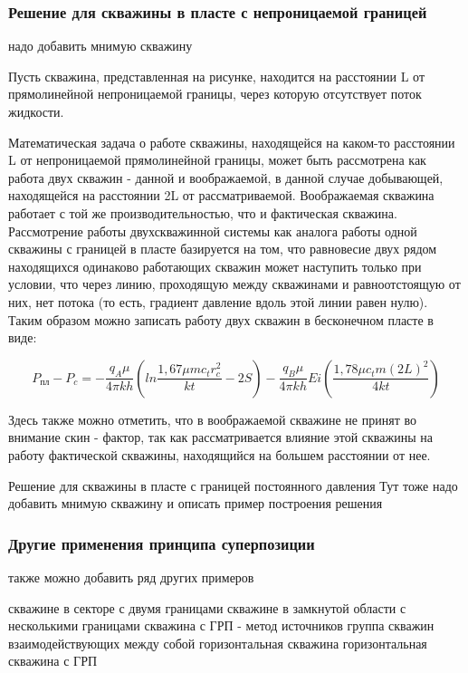 \subsubsection{Решение для скважины в пласте с непроницаемой границей}
надо добавить мнимую скважину

Пусть скважина, представленная на рисунке, находится на расстоянии L от прямолинейной непроницаемой границы, через которую отсутствует поток жидкости.



Математическая задача о работе скважины, находящейся на каком-то расстоянии L от непроницаемой прямолинейной границы, может быть рассмотрена как  работа двух скважин - данной и воображаемой, в данной случае добывающей, находящейся на расстоянии 2L от рассматриваемой. Воображаемая скважина работает с той же производительностью, что и фактическая скважина. Рассмотрение работы двухскважинной системы как аналога работы одной скважины с границей в пласте базируется на том, что равновесие двух рядом находящихся одинаково работающих скважин может наступить только при условии, что через линию, проходящую между скважинами и равноотстоящую от них, нет потока (то есть, градиент давление вдоль этой линии равен нулю). Таким образом можно записать работу двух скважин в бесконечном пласте в виде:

$$ P_{пл} - P_c = - \frac{q_A \mu}{4\pi kh} \left( ln \frac{1,67 \mu m c_t r_c^2}{kt}-2S \right)- \frac{q_B \mu}{4\pi kh} Ei \left( \frac{1,78 \mu c_t m \left(2L\right)^2}{4kt} \right)$$

Здесь также можно отметить, что в воображаемой скважине не принят во внимание скин - фактор, так как рассматривается влияние этой скважины на работу фактической скважины, находящийся на большем расстоянии от нее. 



Решение для скважины в пласте с границей постоянного давления 
Тут тоже надо добавить мнимую скважину и описать пример построения решения


\subsubsection{Другие применения принципа суперпозиции}
также можно добавить ряд других примеров

скважине в секторе с двумя границами
скважине в замкнутой области с несколькими границами 
скважина с ГРП - метод источников
группа скважин взаимодействующих между собой
горизонтальная скважина
горизонтальная скважина с ГРП
